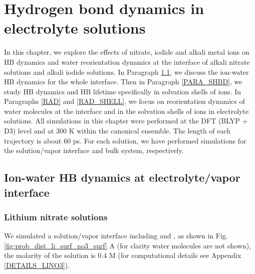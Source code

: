 \chapter{Hydrogen bond dynamics in electrolyte solutions}\label{CHAPTER_HBD_Solutions}
In this chapter, we explore the effects of nitrate, iodide and alkali metal ions 
on HB dynamics and water reorientation dynamics at the interface of alkali nitrate solutions and alkali
iodide solutions. 
In Paragraph \ref{HBD_ITP}, we discuss the ion-water HB dynamics for the whole interface. 
Then in Paragraph \ref{PARA_SHBD}, we study HB dynamics and HB lifetime specifically in solvation shells of ions.
In Paragraphs \ref{RAD} and \ref{RAD_SHELL}, we focus on reorientation dynamics of water molecules at the interface
and in the solvation shells of ions in electrolyte solutions.
All simulations in this chapter were performed at the DFT (BLYP + D3) level and at 300 K within the canonical ensemble.
The length of each trajectory is about 60 ps.
For each solution, we have performed simulations for the solution/vapor interface and bulk system, respectively. 

\section{Ion-water HB dynamics at electrolyte/vapor interface}\label{HBD_ITP}
\subsection{Lithium nitrate solutions} \label{PARAGRAPH_LINO3}
%
%
We simulated a solution/vapor interface including \Li and \nitrate, as shown in Fig.\thinspace\ref{fig:prob_dist_li_surf_no3_surf} A 
(for clarity water molecules are not shown), the \LiN molarity of the solution is 0.4 M 
(for computational details see Appendix \ref{DETAILS_LINO3}).

